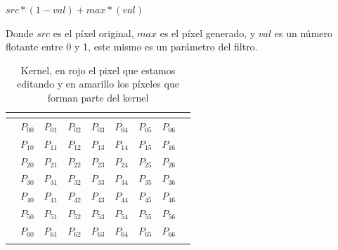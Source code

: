 \begin{center}
	$src * (1 - val) + max * (val)$
\end{center}

Donde $src$ es el píxel original, $max$ es el píxel generado, y $val$ es un número flotante entre 0 y 1, este mismo es un parámetro del filtro.

\begin{table}[h]
\centering
\begin{tabular}{l|c|c|c|c|c|c|c|l}
 & \multicolumn{1}{l|}{}       & \multicolumn{1}{l|}{}      & \multicolumn{1}{l|}{}       & \multicolumn{1}{l|}{}       & \multicolumn{1}{l|}{}       & \multicolumn{1}{l|}{}       & \multicolumn{1}{l|}{}      &  \\ \hline
 & \cellcolor[HTML]{FAFE8E}$P_{00}$ & \cellcolor[HTML]{FAFE8E}$P_{01}$  & \cellcolor[HTML]{FAFE8E}$P_{02}$  & \cellcolor[HTML]{FAFE8E}$P_{03}$  & \cellcolor[HTML]{FAFE8E}$P_{04}$  & \cellcolor[HTML]{FAFE8E}$P_{05}$ & \cellcolor[HTML]{FAFE8E}$P_{06}$ &  \\ \hline
 & \cellcolor[HTML]{FAFE8E}$P_{10}$ & \cellcolor[HTML]{FAFE8E}$P_{11}$  & \cellcolor[HTML]{FAFE8E}$P_{12}$  & \cellcolor[HTML]{FAFE8E}$P_{13}$  & \cellcolor[HTML]{FAFE8E}$P_{14}$  & \cellcolor[HTML]{FAFE8E}$P_{15}$ & \cellcolor[HTML]{FAFE8E}$P_{16}$ &  \\ \hline
 & \cellcolor[HTML]{FAFE8E}$P_{20}$ & \cellcolor[HTML]{FAFE8E}$P_{21}$  & \cellcolor[HTML]{FAFE8E}$P_{22}$  & \cellcolor[HTML]{FAFE8E}$P_{23}$  & \cellcolor[HTML]{FAFE8E}$P_{24}$  & \cellcolor[HTML]{FAFE8E}$P_{25}$ & \cellcolor[HTML]{FAFE8E}$P_{26}$ &  \\ \hline
 & \cellcolor[HTML]{FAFE8E}$P_{30}$ & \cellcolor[HTML]{FAFE8E}$P_{31}$  & \cellcolor[HTML]{FAFE8E}$P_{32}$  & \cellcolor[HTML]{FE8E8E}$P_{33}$  & \cellcolor[HTML]{FAFE8E}$P_{34}$  & \cellcolor[HTML]{FAFE8E}$P_{35}$ & \cellcolor[HTML]{FAFE8E}$P_{36}$ &  \\ \hline
 & \cellcolor[HTML]{FAFE8E}$P_{40}$ & \cellcolor[HTML]{FAFE8E}$P_{41}$  & \cellcolor[HTML]{FAFE8E}$P_{42}$  & \cellcolor[HTML]{FAFE8E}$P_{43}$  & \cellcolor[HTML]{FAFE8E}$P_{44}$  & \cellcolor[HTML]{FAFE8E}$P_{45}$ & \cellcolor[HTML]{FAFE8E}$P_{46}$ &  \\ \hline
 & \cellcolor[HTML]{FAFE8E}$P_{50}$ & \cellcolor[HTML]{FAFE8E}$P_{51}$  & \cellcolor[HTML]{FAFE8E}$P_{52}$  & \cellcolor[HTML]{FAFE8E}$P_{53}$  & \cellcolor[HTML]{FAFE8E}$P_{54}$  & \cellcolor[HTML]{FAFE8E}$P_{55}$ & \cellcolor[HTML]{FAFE8E}$P_{56}$ &  \\ \hline
 & \cellcolor[HTML]{FAFE8E}$P_{60}$ & \cellcolor[HTML]{FAFE8E}$P_{61}$  & \cellcolor[HTML]{FAFE8E}$P_{62}$  & \cellcolor[HTML]{FAFE8E}$P_{63}$  & \cellcolor[HTML]{FAFE8E}$P_{64}$  & \cellcolor[HTML]{FAFE8E}$P_{65}$ & \cellcolor[HTML]{FAFE8E}$P_{66}$ &  \\ \hline
 & \multicolumn{1}{l|}{}      & \multicolumn{1}{l|}{}      & \multicolumn{1}{l|}{}       & \multicolumn{1}{l|}{}       & \multicolumn{1}{l|}{}       & \multicolumn{1}{l|}{}       & \multicolumn{1}{l|}{}      &
\end{tabular}
\caption{Kernel, en rojo el pixel que estamos editando y en amarillo los píxeles que forman parte del kernel}
\end{table}


